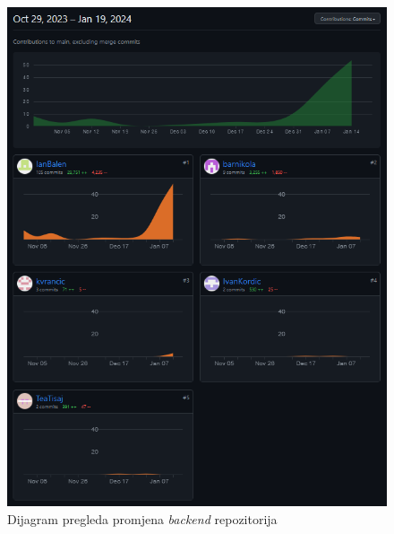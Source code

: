 		\begin{figure}[h]
 		   \centering
 		   \includegraphics[width=\textwidth]{slike/backendGitHub.png} 
 		   \caption{Dijagram pregleda promjena \textit{backend} repozitorija}
 		   \label{fig:my_image}
		\end{figure}

